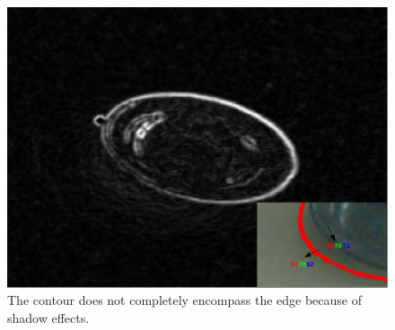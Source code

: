 \begin{figure}[htbp]
  \centering
  \includegraphics[width=12cm]{images/edge.jpg}
  \caption[Shadow effects]{The contour does not completely encompass
    the edge because of shadow effects.}
  \label{fig:rgb}
\end{figure}

